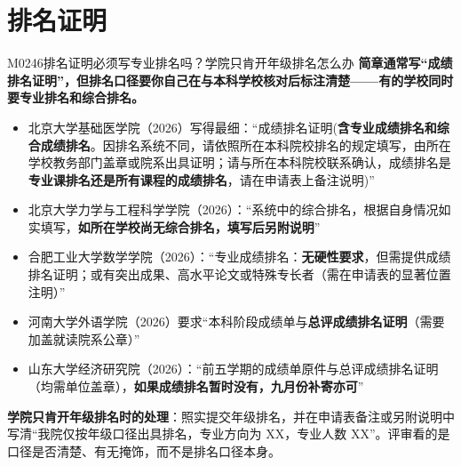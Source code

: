 \section{排名证明}
\begin{qa}{M0246}{排名证明必须写专业排名吗？学院只肯开年级排名怎么办}
\textbf{简章通常写“成绩排名证明”，但排名口径要你自己在与本科学校核对后标注清楚——有的学校同时要专业排名和综合排名。}

\begin{itemize}
  \item 北京大学基础医学院（2026）写得最细：“成绩排名证明(\textbf{含专业成绩排名和综合成绩排名}。因排名系统不同，请依照所在本科院校排名的规定填写，由所在学校教务部门盖章或院系出具证明；请与所在本科院校联系确认，成绩排名是\textbf{专业课排名还是所有课程的成绩排名}，请在申请表上备注说明)”
  \item 北京大学力学与工程科学学院（2026）：“系统中的综合排名，根据自身情况如实填写，\textbf{如所在学校尚无综合排名，填写后另附说明}”
  \item 合肥工业大学数学学院（2026）：“专业成绩排名：\textbf{无硬性要求}，但需提供成绩排名证明；或有突出成果、高水平论文或特殊专长者（需在申请表的显著位置注明）”
  \item 河南大学外语学院（2026）要求“本科阶段成绩单与\textbf{总评成绩排名证明}（需要加盖就读院系公章）”
  \item 山东大学经济研究院（2026）：“前五学期的成绩单原件与总评成绩排名证明（均需单位盖章），\textbf{如果成绩排名暂时没有，九月份补寄亦可}”
\end{itemize}

\textbf{学院只肯开年级排名时的处理}：照实提交年级排名，并在申请表备注或另附说明中写清“我院仅按年级口径出具排名，专业方向为 XX，专业人数 XX”。评审看的是口径是否清楚、有无掩饰，而不是排名口径本身。
\end{qa}


